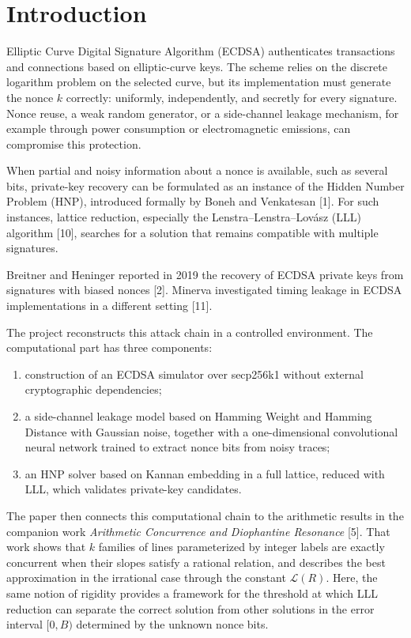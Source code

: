 \documentclass[11pt,a4paper]{article}
\begin{document}
\section{Introduction}

Elliptic Curve Digital Signature Algorithm (ECDSA) authenticates transactions and connections based on elliptic-curve keys. The scheme relies on the discrete logarithm problem on the selected curve, but its implementation must generate the nonce $k$ correctly: uniformly, independently, and secretly for every signature. Nonce reuse, a weak random generator, or a side-channel leakage mechanism, for example through power consumption or electromagnetic emissions, can compromise this protection.

When partial and noisy information about a nonce is available, such as several bits, private-key recovery can be formulated as an instance of the Hidden Number Problem (HNP), introduced formally by Boneh and Venkatesan [1]. For such instances, lattice reduction, especially the Lenstra--Lenstra--Lovász (LLL) algorithm [10], searches for a solution that remains compatible with multiple signatures.

Breitner and Heninger reported in 2019 the recovery of ECDSA private keys from signatures with biased nonces [2]. Minerva investigated timing leakage in ECDSA implementations in a different setting [11].

The project reconstructs this attack chain in a controlled environment. The computational part has three components:
\begin{enumerate}[label=(\roman*),leftmargin=2.5em]
\item construction of an ECDSA simulator over secp256k1 without external cryptographic dependencies;
\item a side-channel leakage model based on Hamming Weight and Hamming Distance with Gaussian noise, together with a one-dimensional convolutional neural network trained to extract nonce bits from noisy traces;
\item an HNP solver based on Kannan embedding in a full lattice, reduced with LLL, which validates private-key candidates.
\end{enumerate}

The paper then connects this computational chain to the arithmetic results in the companion work \emph{Arithmetic Concurrence and Diophantine Resonance} [5]. That work shows that $k$ families of lines parameterized by integer labels are exactly concurrent when their slopes satisfy a rational relation, and describes the best approximation in the irrational case through the constant $\mathcal L(R)$. Here, the same notion of rigidity provides a framework for the threshold at which LLL reduction can separate the correct solution from other solutions in the error interval $[0,B)$ determined by the unknown nonce bits.
\end{document}
